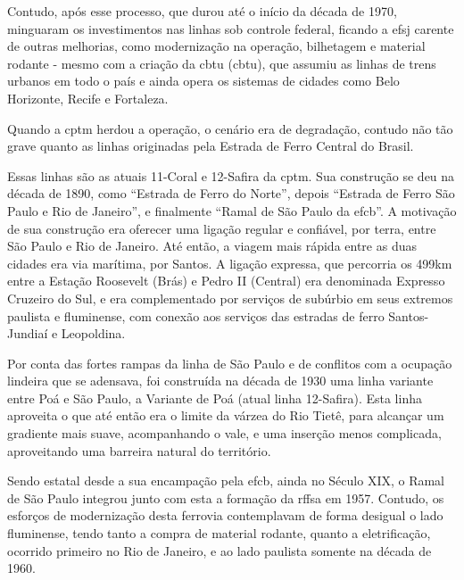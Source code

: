 \documentclass[11pt,fleqn]{book} %
\begin{document}

Contudo, após esse processo, que durou até o início da década de 1970, minguaram os investimentos nas linhas sob controle federal, ficando a \gls{efsj} carente de outras melhorias, como modernização na operação, bilhetagem e material rodante - mesmo com a criação da \glsdesc{cbtu} (\gls{cbtu}), que assumiu as linhas de trens urbanos em todo o país e ainda opera os sistemas de cidades como Belo Horizonte, Recife e Fortaleza. 


Quando a \gls{cptm} herdou a operação, o cenário era de degradação, contudo não tão grave quanto as linhas originadas pela Estrada de Ferro Central do Brasil.

Essas linhas são as atuais 11-Coral e 12-Safira da \gls{cptm}. Sua construção se deu na década de 1890, como \enquote{Estrada de Ferro do Norte}, depois \enquote{Estrada de Ferro São Paulo e Rio de Janeiro}, e finalmente \enquote{Ramal de São Paulo da \glsdesc{efcb}}. A motivação de sua construção era oferecer uma ligação regular e confiável, por terra, entre São Paulo e Rio de Janeiro. Até então, a viagem mais rápida entre as duas cidades era via marítima, por Santos. A ligação expressa, que percorria os 499km entre a Estação Roosevelt (Brás) e Pedro II (Central) era denominada Expresso Cruzeiro do Sul, e era complementado por serviços de subúrbio em seus extremos paulista e fluminense, com conexão aos serviços das estradas de ferro Santos-Jundiaí e Leopoldina.


Por conta das fortes rampas da linha de São Paulo e de conflitos com a ocupação lindeira que se adensava, foi construída na década de 1930 uma linha variante entre Poá e São Paulo, a Variante de Poá (atual linha 12-Safira). Esta linha aproveita o que até então era o limite da várzea do Rio Tietê, para alcançar um gradiente mais suave, acompanhando o vale, e uma inserção menos complicada, aproveitando uma barreira natural do território.

Sendo estatal desde a sua encampação pela \gls{efcb}, ainda no Século XIX, o Ramal de São Paulo integrou junto com esta a formação da \gls{rffsa} em 1957. Contudo, os esforços de modernização desta ferrovia contemplavam de forma desigual o lado fluminense, tendo tanto a compra de material rodante, quanto a eletrificação, ocorrido primeiro no Rio de Janeiro, e ao lado paulista somente na década de 1960.

\end{document}
